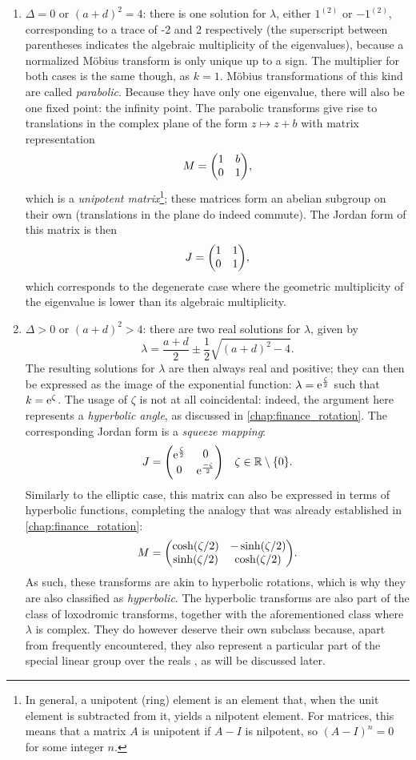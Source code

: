 \begin{enumerate}
\begin{enumerate}
        \end{enumerate}
    \item \(\Delta = 0\) or \((a + d)^2 = 4\): there is one solution for \(\lambda\), either \(1^{(2)}\) or \(-1^{(2)}\), corresponding to a trace of -2 and 2 respectively (the superscript between parentheses indicates the algebraic multiplicity of the eigenvalues), because a normalized Möbius transform is only unique up to a sign. The multiplier for both cases is the same though, as \(k = 1\). Möbius transformations of this kind are called \emph{parabolic}. Because they have only one eigenvalue, there will also be one fixed point: the infinity point. The parabolic transforms give rise to translations in the complex plane of the form \(z \mapsto z + b\) with matrix representation
    \[ M = \mqty(1 & b \\ 0 & 1 ), \]
    which is a \emph{unipotent matrix}\footnote{In general, a unipotent (ring) element is an element that, when the unit element is subtracted from it, yields a nilpotent element. For matrices, this means that a matrix \(A\) is unipotent if \(A - I\) is nilpotent, so \((A - I)^n = 0\) for some integer \(n\).}; these matrices form an abelian subgroup on their own (translations in the plane do indeed commute). The Jordan form of this matrix is then
    \[ J = \mqty( 1 & 1 \\ 0 & 1 ), \]
    which corresponds to the degenerate case where the geometric multiplicity of the eigenvalue is lower than its algebraic multiplicity.
    \item \(\Delta > 0\) or \((a + d)^2 > 4\): there are two real solutions for \(\lambda\), given by
        \[ \lambda = \frac{a + d}{2} \pm \frac{1}{2}\sqrt{(a + d)^2 - 4}. \]
        The resulting solutions for \(\lambda\) are then always real and positive; they can then be expressed as the image of the exponential function: \(\lambda = \mathrm{e}^{\frac{\zeta}{2}}\) such that \(k = \mathrm{e}^{\zeta}\). The usage of \(\zeta\) is not at all coincidental: indeed, the argument here represents a \emph{hyperbolic angle}, as discussed in \cref{chap:finance_rotation}. The corresponding Jordan form is a 
        \emph{squeeze mapping}:
        \[ J = \mqty(\dmat[0]{\ec^{\frac{\zeta}{2}}, \ec^{\frac{-\zeta}{2}}})
        \quad \zeta \in \real\setminus\qty{0}. \]
        Similarly to the elliptic case, this matrix can also be expressed in terms of hyperbolic functions, completing the analogy that was already established in \cref{chap:finance_rotation}:
        \[ M = \mqty(\cosh(\zeta/2) & -\sinh(\zeta/2)\\ 
                     \sinh(\zeta/2) & \cosh(\zeta/2)). \]
        As such, these transforms are akin to hyperbolic rotations, which is why they are also classified as \emph{hyperbolic}. The hyperbolic transforms are also part of the class of loxodromic transforms, together with the aforementioned class where \(\lambda\) is complex. They do however deserve their own subclass because, apart from frequently encountered, they also represent a particular part of the special linear group over the reals , as will be discussed later.
\end{enumerate}
